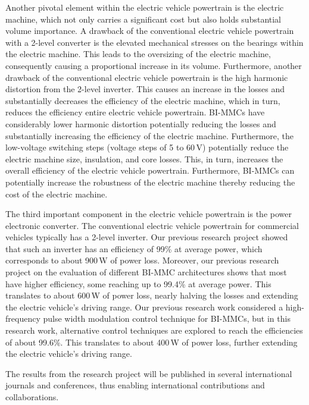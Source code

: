 \documentclass{article}
\begin{document}
Another pivotal element within the electric vehicle powertrain is the electric machine, which not only carries a significant cost but also holds substantial volume importance. 
A drawback of the conventional electric vehicle powertrain with a 2-level converter is the elevated mechanical stresses on the bearings within the electric machine. This leads to the oversizing of the electric machine, consequently causing a proportional increase in its volume. Furthermore, another drawback of the conventional electric vehicle powertrain is the high harmonic distortion from the 2-level inverter. This causes an increase in the losses and substantially decreases the efficiency of the electric machine, which in turn, reduces the efficiency entire electric vehicle powertrain. BI-MMCs have considerably lower harmonic distortion potentially reducing the losses and substantially increasing the efficiency of the electric machine. Furthermore, the low-voltage switching steps (voltage steps of 5 to 60\,V) potentially reduce the electric machine size, insulation, and core losses. This, in turn, increases the overall efficiency of the electric vehicle powertrain. Furthermore, BI-MMCs can potentially increase the robustness of the electric machine thereby reducing the cost of the electric machine.

The third important component in the electric vehicle powertrain is the power electronic converter. The conventional electric vehicle powertrain for commercial vehicles typically has a 2-level inverter.  Our previous research project \cite{balachandran2023battery} showed that such an inverter has an efficiency of 99\% at average power, which corresponds to about 900\,W of power loss. Moreover, our previous research project \cite{balachandran2023battery} on the evaluation of different BI-MMC architectures shows that most have higher efficiency, some reaching up to 99.4\% at average power. This translates to about 600\,W of power loss, nearly halving the losses and extending the electric vehicle's driving range. Our previous research work \cite{balachandran2023battery} considered a high-frequency pulse width modulation control technique for BI-MMCs, but in this research work, alternative control techniques are explored to reach the efficiencies of about 99.6\%. This translates to about 400\,W of power loss, further extending the electric vehicle's driving range. 

The results from the research project will be published in several international journals and conferences, thus enabling international contributions and collaborations. 
\end{document}
